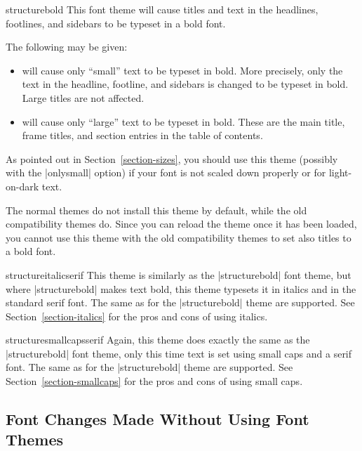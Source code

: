\begin{fontthemeexample}{structurebold}
  This font theme will cause titles and text in the headlines, footlines, and sidebars to be typeset in a bold font.

  The following  may be given:
  \begin{itemize}
  \item
    will cause only ``small'' text to be typeset in bold. More precisely, only the text in the headline, footline, and sidebars is changed to be typeset in bold. Large titles are not affected.
  \item
    will cause only ``large'' text to be typeset in bold. These are the main title, frame titles, and section entries in the table of contents.
  \end{itemize}

  As pointed out in Section~\ref{section-sizes}, you should use this theme (possibly with the |onlysmall| option) if your font is not scaled down properly or for light-on-dark text.

  The normal themes do not install this theme by default, while the old compatibility themes do. Since you can reload the theme once it has been loaded, you cannot use this theme with the old compatibility themes to set also titles to a bold font.
\end{fontthemeexample}

\begin{fontthemeexample}{structureitalicserif}
  This theme is similarly as the |structurebold| font theme, but where |structurebold| makes text bold, this theme typesets it in italics and in the standard serif font. The same  as for the |structurebold| theme are supported. See Section~\ref{section-italics} for the pros and cons of using italics.
\end{fontthemeexample}

\begin{fontthemeexample}{structuresmallcapsserif}
  Again, this theme does exactly the same as the |structurebold| font theme, only this time text is set using small caps and a serif font. The same  as for the |structurebold| theme are supported. See Section~\ref{section-smallcaps} for the pros and cons of using small caps.
\end{fontthemeexample}


\subsection{Font Changes Made Without Using Font Themes}

